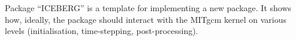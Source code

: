 
Package ``ICEBERG'' is a template for implementing a new package.
It shows how, ideally, the package should interact with the
MITgcm kernel on various levels (initialisation, time-stepping,
post-processing).
